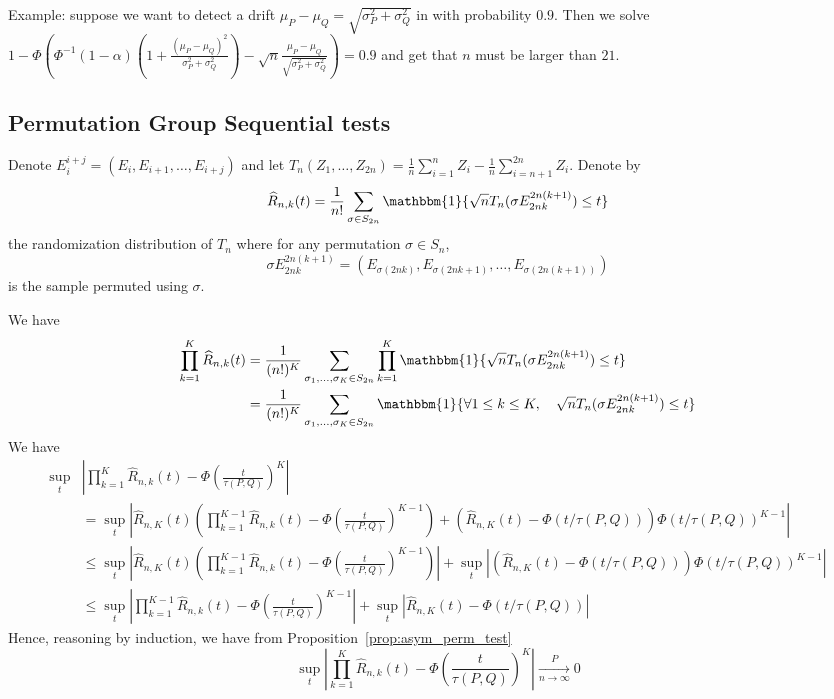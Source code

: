 \documentclass{article}
\theoremstyle{plain}
\theoremstyle{remark}
\newcommand{\1}{\mathbbm{1}}
\numberwithin{equation}{section}
\begin{document}
Example: suppose we want to detect a drift $\mu_P-\mu_Q=\sqrt{\sigma_P^2+\sigma_Q^2}$ in with probability $0.9$. Then we solve $1-\Phi\left(\Phi^{-1}(1-\alpha)\left(1+\frac{(\mu_P-\mu_Q)^2}{\sigma_P^2+\sigma_Q^2 }\right)-  \sqrt{n}\frac{\mu_P-\mu_Q}{\sqrt{\sigma_P^2+\sigma_Q^2}} \right) = 0.9$ and get that $n$ must be larger than $21$.

\subsection{Permutation Group Sequential tests}



Denote $E_{i}^{i+j}=(E_i, E_{i+1},\dots, E_{i+j})$ and let $T_n(Z_1,\dots,Z_{2n})=\frac{1}{n}\sum_{i=1}^n Z_i -\frac{1}{n}\sum_{i=n+1}^{2n} Z_i$. Denote by
$$\widehat{R}_{n,k}(t)=\frac{1}{n!}\sum_{\sigma \in S_{2n}} \1\{\sqrt{n}T_n(\sigma E_{2nk}^{2n(k+1)}) \le t\} $$
the randomization distribution of $T_n$ where for any permutation $\sigma \in S_n$,
$$\sigma E_{2nk}^{2n(k+1)}=(E_{\sigma(2nk)},E_{\sigma(2nk+1)},\dots,E_{\sigma(2n(k+1))})$$
is the sample permuted using $ \sigma$.


We have
\begin{align*}
\prod_{k=1}^K \widehat{R}_{n,k}(t) &=\frac{1}{(n!)^K}\sum_{\sigma_1,\dots,\sigma_K \in S_{2n}} \prod_{k=1}^K \1\{\sqrt{n}T_n(\sigma E_{2nk}^{2n(k+1)}) \le t\} \\
&=\frac{1}{(n!)^K}\sum_{\sigma_1,\dots,\sigma_K \in S_{2n}}  \1\{ \forall 1\le k\le K, \quad \sqrt{n} T_n(\sigma E_{2nk}^{2n(k+1)}) \le t\}
\end{align*}
We have
\begin{align*}
\sup_{t}&\left|\prod_{k=1}^K \widehat{R}_{n,k}(t) - \Phi\left( \frac{t}{\tau(P,Q)}\right)^{K} \right| \\
&= \sup_t \left| \widehat{R}_{n,K}(t)\left(\prod_{k=1}^{K-1} \widehat{R}_{n,k}(t) - \Phi\left( \frac{t}{\tau(P,Q)}\right)^{K-1}\right) + (\widehat{R}_{n,K}(t)-\Phi(t/\tau(P,Q))) \Phi(t/\tau(P,Q))^{K-1} \right|\\
&\le \sup_t \left| \widehat{R}_{n,K}(t)\left(\prod_{k=1}^{K-1} \widehat{R}_{n,k}(t) - \Phi\left( \frac{t}{\tau(P,Q)}\right)^{K-1}\right)\right| + \sup_t\left|(\widehat{R}_{n,K}(t)-\Phi(t/\tau(P,Q))) \Phi(t/\tau(P,Q))^{K-1} \right|\\
&\le \sup_t \left|\prod_{k=1}^{K-1} \widehat{R}_{n,k}(t) - \Phi\left( \frac{t}{\tau(P,Q)}\right)^{K-1}\right| + \sup_t\left|\widehat{R}_{n,K}(t)-\Phi(t/\tau(P,Q)) \right|
\end{align*}
Hence, reasoning by induction, we have from Proposition~\ref{prop:asym_perm_test}
$$\sup_{t}\left|\prod_{k=1}^K \widehat{R}_{n,k}(t) - \Phi\left( \frac{t}{\tau(P,Q)}\right)^{K} \right|\xrightarrow[n \to \infty]{P} 0$$
\end{document}

